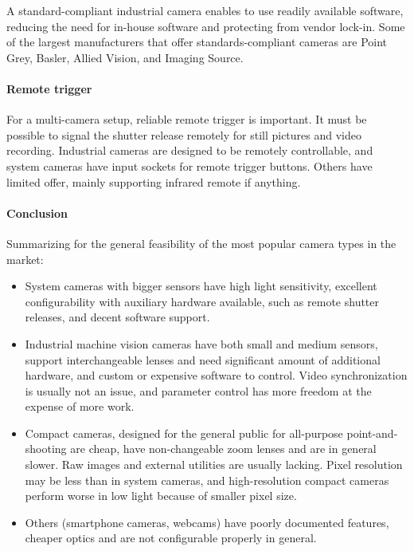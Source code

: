A standard-compliant industrial camera enables to use readily available software, reducing the need for in-house software and protecting from vendor lock-in.
Some of the largest manufacturers that offer standards-compliant cameras are Point Grey, Basler, Allied Vision, and Imaging Source.



\paragraph{Remote trigger}
For a multi-camera setup, reliable remote trigger is important.
It must be possible to signal the shutter release remotely for still pictures and video recording.
Industrial cameras are designed to be remotely controllable, and system cameras have input sockets for remote trigger buttons.
Others have limited offer, mainly supporting infrared remote if anything.


\paragraph{Conclusion}
Summarizing for the general feasibility of the most popular camera types in the market:

\begin{itemize}
	\item System cameras with bigger sensors have high light sensitivity, excellent configurability with auxiliary hardware available, such as remote shutter releases, and decent software support.
	\item Industrial machine vision cameras have both small and medium sensors, support interchangeable lenses and need significant amount of additional hardware, and custom or expensive software to control.
		Video synchronization is usually not an issue, and parameter control has more freedom at the expense of more work.
	\item Compact cameras, designed for the general public for all-purpose point-and-shooting are cheap, have non-changeable zoom lenses and are in general slower.
		Raw images and external utilities are usually lacking.
		Pixel resolution may be less than in system cameras, and high-resolution compact cameras perform worse in low light because of smaller pixel size.
	\item Others (smartphone cameras, webcams) have poorly documented features, cheaper optics and are not configurable properly in general.
\end{itemize}

